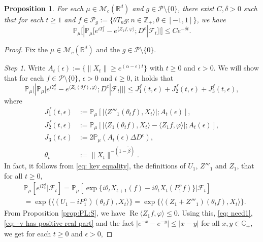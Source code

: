 \documentclass[12pt,a4paper]{amsart}
\theoremstyle{plain}
\newtheorem{prop}[thm]{Proposition}
\theoremstyle{definition}
\numberwithin{equation}{section}
\begin{document}
\begin{prop}
  \label{thm:Key}
  For each $\mu \in \mathcal M_c(\mathbb R^d)$ and $g \in \mathcal P \setminus \{0\}$, there exist $C,\delta>0$ such that 
    for each $t\geq 1$ and $f \in \mathcal P_g:= \{\theta T_ng:n \in \mathbb Z_+, \theta \in [-1,1]\}$, we have 
    \[
      \mathbb P_\mu 
      \Big[  |\mathbb P_\mu [e^{i\Upsilon^f_t} - e^{\langle Z_1f, \varphi\rangle}; D^c | \mathscr F_t ]  |\Big]
      \leq C e^{- \delta t}.
    \]
\end{prop}
\begin{proof}
  Fix the $\mu \in \mathcal M_c(\mathbb R^d)$ and the $g \in \mathcal P\setminus \{0\}$.
  
  \emph{Step 1.} Write $ A_t(\epsilon) :=\{ \|X_t\| \geq e^{(\alpha - \epsilon)t} \} $ with $t\geq 0$ and $\epsilon > 0$. 
  We will show that for each $f\in \mathcal P \setminus \{0\}$, $\epsilon > 0$ and $t\geq 0$, it holds that
  \[  
    \mathbb P_\mu \Big[ | \mathbb P_\mu [e^{i\Upsilon^f_t} - e^{\langle Z_1(\theta f), \varphi\rangle}; D^c | \mathscr F_t ]| \Big]
    \leq J^f_1(t,\epsilon)+J^f_2(t,\epsilon)+J^f_3(t,\epsilon),
  \]
where
\begin{align}
\label{eq: Def of Ji}
  J^f_1(t,\epsilon)
  & := \mathbb{P}_{\mu} [ |\langle Z'''_1(\theta_t f), X_t\rangle |; A_t(\epsilon) ],
  \\ J^f_2(t,\epsilon)
  & := \mathbb{P}_{\mu}[|\langle Z_1(\theta_t f),X_t \rangle-\langle Z_1f, \varphi\rangle |; A_t(\epsilon)],
  \\ J_3(t,\epsilon)
  & :=2\mathbb{P}_{\mu}(A_t (\epsilon)\Delta D^c),
  \\ \theta_t
  & := \|X_t\|^{-(1 - \tilde \beta)}.
\end{align}
In fact, it follows from \eqref{eq: key equality}, the definitions of $U_1$, $Z'''_1$ and $Z_1$, that for all $t\geq 0$,
\begin{align}
  \label{eq: need1}
  & \mathbb{P}_{\mu}[e^{i\Upsilon^f_t}|\mathscr{F}_t] 
    = \mathbb{P}_{\mu}[\exp\{i\theta_t X_{t+1} (f) - i \theta_t X_t(P_1^\alpha f)\} |\mathscr{F}_{t}] \\
  & = \exp\{\langle (U_1 - iP^\alpha_1 ) (\theta_t f),X_t\rangle\} 
    = \exp\{\langle (Z_1 + Z'''_1) (\theta_t f),X_t\rangle\}.
\end{align}
From Proposition \ref{prop:PL:S}, we have $\operatorname{Re} \langle Z_1f, \varphi\rangle \leq 0$.
Using this, \eqref{eq: need1}, \eqref{eq: -v has positive real part} and the fact $|e^{-x} - e^{-y}| \leq |x-y|$ for all $x,y \in \mathbb C_+$, we get for each $t\geq 0$ and $\epsilon> 0$,

\end{proof}
\end{document}

